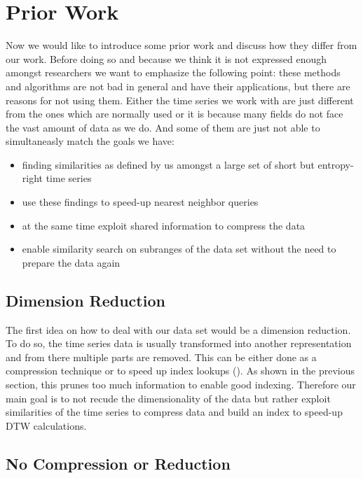 \section{Prior Work}
\label{sec:baseline:prior}

Now we would like to introduce some prior work and discuss how they differ from our work. Before doing so and because we think it is not expressed enough amongst researchers we want to emphasize the following point: these methods and algorithms are not bad in general and have their applications, but there are reasons for not using them. Either the time series we work with are just different from the ones which are normally used or it is because many fields do not face the vast amount of data as we do. And some of them are just not able to simultaneasly match the goals we have:

\begin{itemize}
    \item finding similarities as defined by us amongst a large set of short but entropy-right time series
    \item use these findings to speed-up nearest neighbor queries
    \item at the same time exploit shared information to compress the data
    \item enable similarity search on subranges of the data set without the need to prepare the data again
\end{itemize}


\subsection{Dimension Reduction}
\label{ssec:baseline:prior:dimred}

The first idea on how to deal with our data set would be a dimension reduction. To do so, the time series data is usually transformed into another representation and from there multiple parts are removed. This can be either done as a compression technique or to speed up index lookups (\cite{LB_Keogh,LB_Improved,dimred1,dimred2}). As shown in the previous section, this prunes too much information to enable good indexing. Therefore our main goal is to not recude the dimensionality of the data but rather exploit similarities of the time series to compress data and build an index to speed-up DTW calculations.


\subsection{No Compression or Reduction}
\label{ssec:baseline:prior:nocompression}

